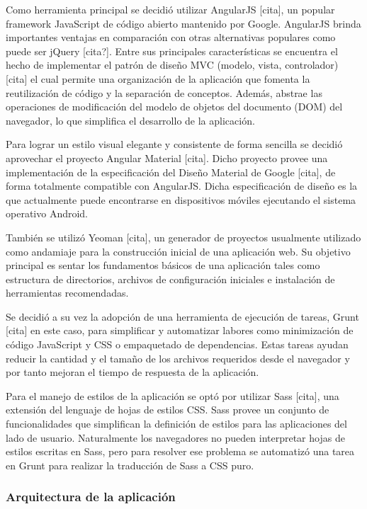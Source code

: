 Como herramienta principal se decidió utilizar AngularJS [cita], un popular framework JavaScript de
código abierto mantenido por Google. AngularJS brinda importantes ventajas en comparación con otras
alternativas populares como puede ser jQuery [cita?]. Entre sus principales características se encuentra
el hecho de implementar el patrón de diseño MVC (modelo, vista, controlador) [cita] el cual permite una
organización de la aplicación que fomenta la reutilización de código y la separación de conceptos.
Además, abstrae las operaciones de modificación del modelo de objetos del documento (DOM) del navegador,
lo que simplifica el desarrollo de la aplicación.

Para lograr un estilo visual elegante y consistente de forma sencilla se decidió aprovechar el proyecto
Angular Material [cita]. Dicho proyecto provee una implementación de la especificación del Diseño Material
de Google [cita], de forma totalmente compatible con AngularJS. Dicha especificación de diseño es la que
actualmente puede encontrarse en dispositivos móviles ejecutando el sistema operativo Android.

También se utilizó Yeoman [cita], un generador de proyectos usualmente utilizado como andamiaje para la
construcción inicial de una aplicación web. Su objetivo principal es sentar los fundamentos básicos de
una aplicación tales como estructura de directorios, archivos de configuración iniciales e instalación
de herramientas recomendadas.

Se decidió a su vez la adopción de una herramienta de ejecución de tareas, Grunt [cita] en este caso,
para simplificar y automatizar labores como minimización de código JavaScript y CSS o empaquetado de
dependencias. Estas tareas ayudan reducir la cantidad y el tamaño de los archivos requeridos desde el
navegador y por tanto mejoran el tiempo de respuesta de la aplicación.

Para el manejo de estilos de la aplicación se optó por utilizar Sass [cita], una extensión del lenguaje de hojas de estilos CSS. Sass provee un conjunto de funcionalidades que simplifican la definición de estilos para las aplicaciones del lado de usuario. Naturalmente los navegadores no pueden interpretar hojas de estilos escritas en Sass, pero para resolver ese problema se automatizó una tarea en Grunt para realizar la traducción de Sass a CSS puro.

\subsubsection{Arquitectura de la aplicación}

